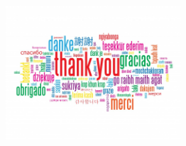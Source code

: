 \documentclass[xcolor=x11names,compress, 
					handout %
]{beamer}
\theoremstyle{definition} \newtheorem{esempio}{Esempio}
\theoremstyle{definition}
\begin{document}
	\begin{frame}
		\begin{center}
			\includegraphics[width=6.5cm]{./immagini/thanks}
		\end{center}
	\end{frame}
\end{document}
